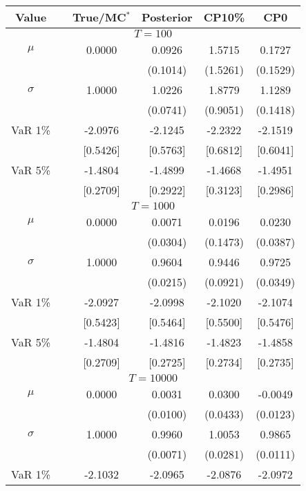 { \renewcommand{\arraystretch}{1.2} 
\begin{table} 
\center 
\begin{tabular}{cc cccc} 
Value & & True/MC$^*$ & Posterior & CP10\% & CP0 \\ \hline 
\hline 
\multicolumn{6}{c}{$T =100$}  \\ 
\hline 
$\mu$&& 0.0000 & 0.0926 & 1.5715 & 0.1727  \\ 
&&   & (0.1014) & (1.5261) & (0.1529)  \\ 
$\sigma$&& 1.0000 & 1.0226 & 1.8779 & 1.1289  \\ 
&&   & (0.0741) & (0.9051) & (0.1418)  \\ 
VaR 1\% && -2.0976 & -2.1245 & -2.2322 & -2.1519  \\ 
  && [0.5426] & [0.5763] & [0.6812] & [0.6041]  \\ 
VaR 5\% && -1.4804 & -1.4899 & -1.4668 & -1.4951  \\ 
 && [0.2709] & [0.2922] & [0.3123] & [0.2986]  \\ 
\hline 
\multicolumn{6}{c}{$T =1000$}  \\ 
\hline 
$\mu$&& 0.0000 & 0.0071 & 0.0196 & 0.0230  \\ 
&&   & (0.0304) & (0.1473) & (0.0387)  \\ 
$\sigma$&& 1.0000 & 0.9604 & 0.9446 & 0.9725  \\ 
&&   & (0.0215) & (0.0921) & (0.0349)  \\ 
VaR 1\% && -2.0927 & -2.0998 & -2.1020 & -2.1074  \\ 
  && [0.5423] & [0.5464] & [0.5500] & [0.5476]  \\ 
VaR 5\% && -1.4804 & -1.4816 & -1.4823 & -1.4858  \\ 
 && [0.2709] & [0.2725] & [0.2734] & [0.2735]  \\ 
\hline 
\multicolumn{6}{c}{$T =10000$}  \\ 
\hline 
$\mu$&& 0.0000 & 0.0031 & 0.0300 & -0.0049  \\ 
&&   & (0.0100) & (0.0433) & (0.0123)  \\ 
$\sigma$&& 1.0000 & 0.9960 & 1.0053 & 0.9865  \\ 
&&   & (0.0071) & (0.0281) & (0.0111)  \\ 
VaR 1\% && -2.1032 & -2.0965 & -2.0876 & -2.0972  \\ 

\end{tabular}
\end{table}}

